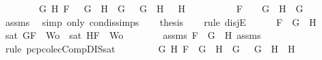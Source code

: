 \begin{isabellebody}
\ \ \ \ \ \ \ \ {\isacharparenleft}{\isasymexists}G{}\ H{}{\isachardot}\ F\ {\isacharequal}\ \isactrlbold {\isasymnot}\ {\isacharparenleft}G{}\ \isactrlbold {\isasymand}\ H{}{\isacharparenright}\ {\isasymand}\ G\ {\isacharequal}\ \isactrlbold {\isasymnot}\ G{}\ {\isasymand}\ H\ {\isacharequal}\ \isactrlbold {\isasymnot}\ H{}{\isacharparenright}\ {\isasymor}\ \isanewline
\ \ \ \ \ \ \ \ F\ {\isacharequal}\ \isactrlbold {\isasymnot}\ {\isacharparenleft}\isactrlbold {\isasymnot}\ G{\isacharparenright}\ {\isasymand}\ H\ {\isacharequal}\ G{\isacharparenright}{\isachardoublequoteclose}\isanewline
\ \ \ \ \isamarkupfalse%
\ assms{\isacharparenleft}{}{\isacharparenright}\ \isamarkupfalse%
\ {\isacharparenleft}simp\ only{\isacharcolon}\ con{\isacharunderscore}dis{\isacharunderscore}simps{\isacharparenleft}{}{\isacharparenright}{\isacharparenright}\isanewline
\ \ \isamarkupfalse%
\ {\isacharquery}thesis\isanewline
\ \ \isamarkupfalse%
\ {\isacharparenleft}rule\ disjE{\isacharparenright}\isanewline
\ \ \ \ \isamarkupfalse%
\ {\isachardoublequoteopen}F\ {\isacharequal}\ G\ \isactrlbold {\isasymor}\ H{\isachardoublequoteclose}\isanewline
\ \ \ \ \isamarkupfalse%
\ {\isachardoublequoteopen}sat\ {\isacharparenleft}{\isacharbraceleft}G{\isacharcomma}F{\isacharbraceright}\ {\isasymunion}\ Wo{\isacharparenright}\ {\isasymor}\ sat\ {\isacharparenleft}{\isacharbraceleft}H{\isacharcomma}F{\isacharbraceright}\ {\isasymunion}\ Wo{\isacharparenright}{\isachardoublequoteclose}\isanewline
\ \ \ \ \ \ \isamarkupfalse%
\ assms{\isacharparenleft}{}{\isacharparenright}\ {\isacartoucheopen}F\ {\isacharequal}\ G\ \isactrlbold {\isasymor}\ H{\isacartoucheclose}\ assms{\isacharparenleft}{}{\isacharcomma}{}{\isacharcomma}{}{\isacharparenright}\ \isamarkupfalse%
\ {\isacharparenleft}rule\ pcp{\isacharunderscore}colecComp{\isacharunderscore}DIS{\isacharunderscore}sat{}{\isacharparenright}\isanewline
\ \ \isamarkupfalse%
\isanewline
\ \ \ \ \isamarkupfalse%
\ {\isachardoublequoteopen}{\isacharparenleft}{\isasymexists}G{}\ H{}{\isachardot}\ F\ {\isacharequal}\ G{}\ \isactrlbold {\isasymrightarrow}\ H{}\ {\isasymand}\ G\ {\isacharequal}\ \isactrlbold {\isasymnot}\ G{}\ {\isasymand}\ H\ {\isacharequal}\ H{}{\isacharparenright}\ {\isasymor}\ \isanewline

\end{isabellebody}
